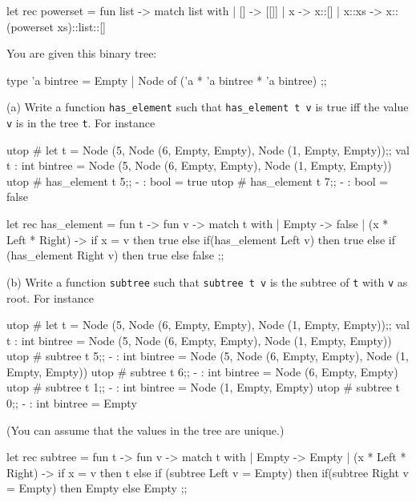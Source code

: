 \ANSWER
\begin{answercode}

let rec powerset = fun list ->
match list with 
| [] -> [[]]
| x -> x::[]
| x::xs -> x::(powerset xs)::list::[]


\end{answercode}


\newpage
\nextq
You are given this binary tree:
\begin{console}
type 'a bintree = Empty
                | Node of ('a * 'a bintree * 'a bintree)
;;
\end{console}
(a) Write a function \verb!has_element! such that
\verb!has_element t v! is true iff the value \verb!v! is in the
tree \verb!t!.
For instance
\begin{console}
utop # let t = Node (5, Node (6, Empty, Empty), Node (1, Empty, Empty));;
val t : int bintree = Node (5, Node (6, Empty, Empty), Node (1, Empty, Empty))
utop # has_element t 5;;
- : bool = true
utop # has_element t 7;;
- : bool = false
\end{console}
\ANSWER
\begin{answercode}
let rec has_element = fun t -> fun v ->
	match t with 
	| Empty -> false
	| (x * Left * Right) -> if x = v then 
								true
					 		else
								if(has_element Left v) then
									true
								else if (has_element Right v) then
									true
								else
									false
;;
									
\end{answercode}

(b)
Write a function \verb!subtree! such that 
\verb!subtree t v! is the subtree of \verb!t! with \verb!v! as root.
For instance
\begin{console}
utop # let t = Node (5, Node (6, Empty, Empty), Node (1, Empty, Empty));;
val t : int bintree = Node (5, Node (6, Empty, Empty), Node (1, Empty, Empty))
utop # subtree t 5;;
- : int bintree = Node (5, Node (6, Empty, Empty), Node (1, Empty, Empty))
utop # subtree t 6;;
- : int bintree = Node (6, Empty, Empty)
utop # subtree t 1;;
- : int bintree = Node (1, Empty, Empty)
utop # subtree t 0;;
- : int bintree = Empty
\end{console}
(You can assume that the values in the tree are unique.)
\\
\ANSWER
\begin{answercode}
let rec subtree = fun t -> fun v ->
	match t with
	| Empty -> Empty
	| (x * Left * Right) -> if x = v then 
								t
							else if (subtree Left v = Empty) then
								if(subtree Right v = Empty) then
									Empty
								else 
								 	Empty
;;

\end{answercode}


%

